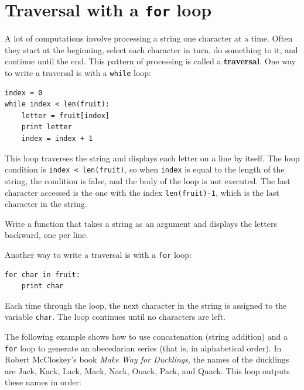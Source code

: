 \documentclass[10pt]{book}
\begin{document}


\section{Traversal with a {\tt for} loop}
\label{for}


A lot of computations involve processing a string one character at a
time.  Often they start at the beginning, select each character in
turn, do something to it, and continue until the end.  This pattern of
processing is called a {\bf traversal}.  One way to write a traversal
is with a {\tt while} loop:

\beforeverb
\begin{verbatim}
index = 0
while index < len(fruit):
    letter = fruit[index]
    print letter
    index = index + 1
\end{verbatim}
\afterverb
%
This loop traverses the string and displays each letter on a line by
itself.  The loop condition is {\tt index < len(fruit)}, so
when {\tt index} is equal to the length of the string, the
condition is false, and the body of the loop is not executed.  The
last character accessed is the one with the index {\tt len(fruit)-1},
which is the last character in the string.

\begin{ex}
Write a function that takes a string as an argument
and displays the letters backward, one per line.
\end{ex}

Another way to write a traversal is with a {\tt for} loop:

\beforeverb
\begin{verbatim}
for char in fruit:
    print char
\end{verbatim}
\afterverb
%
Each time through the loop, the next character in the string is assigned
to the variable {\tt char}.  The loop continues until no characters are
left.


The following example shows how to use concatenation (string addition)
and a {\tt for} loop to generate an abecedarian series (that is, in
alphabetical order).  In Robert McCloskey's book {\em Make
Way for Ducklings}, the names of the ducklings are Jack, Kack, Lack,
Mack, Nack, Ouack, Pack, and Quack.  This loop outputs these names in
order:
\end{document}
